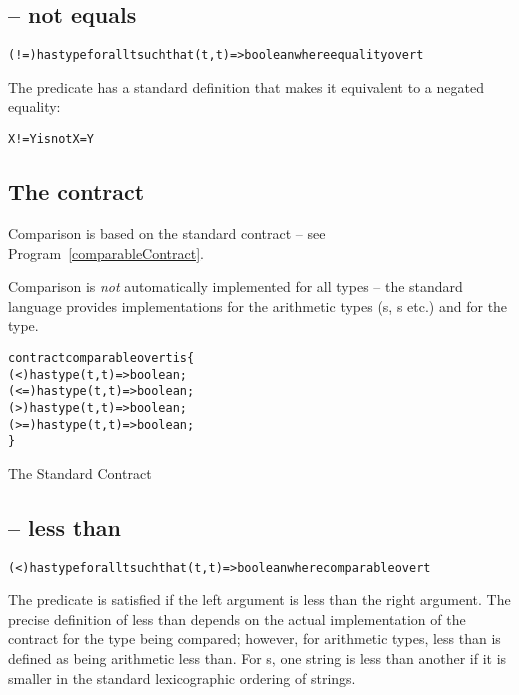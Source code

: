\subsection{\q{!=} -- not equals}
\label{notEqualsPredicate}
\begin{alltt}
(!=) has type for all t such that (t,t) => boolean where equality over t
\end{alltt}
The \q{!=} predicate has a standard definition that makes it equivalent to a negated equality:
\begin{alltt}
X != Y is not X=Y
\end{alltt}

\subsection{The  contract}
\label{comparisonPredicates}

Comparison is based on the standard  contract -- see Program~\vref{comparableContract}.

Comparison is \emph{not} automatically implemented for all types -- the standard language provides implementations for the arithmetic types (s, s etc.) and for the  type.


\begin{program}
\begin{alltt}
contract comparable over t is \{
  (<) has type (t,t)=>boolean;
  (<=) has type (t,t)=>boolean;
  (>) has type (t,t)=>boolean;
  (>=) has type (t,t)=>boolean;
\}
\end{alltt}
\caption{The Standard  Contract\label{comparableContract}}
\end{program}

\subsection{\q{<} -- less than}
\begin{alltt}
(<) has type for all t such that (t,t)=>boolean where comparable over t
\end{alltt}

The \q{<} predicate is satisfied if the left argument is less than the right argument. The precise definition of less than depends on the actual implementation of the  contract for the type being compared; however, for arithmetic types, less than is defined as being arithmetic less than. For s, one string is less than another if it is smaller in the standard lexicographic ordering of strings.

